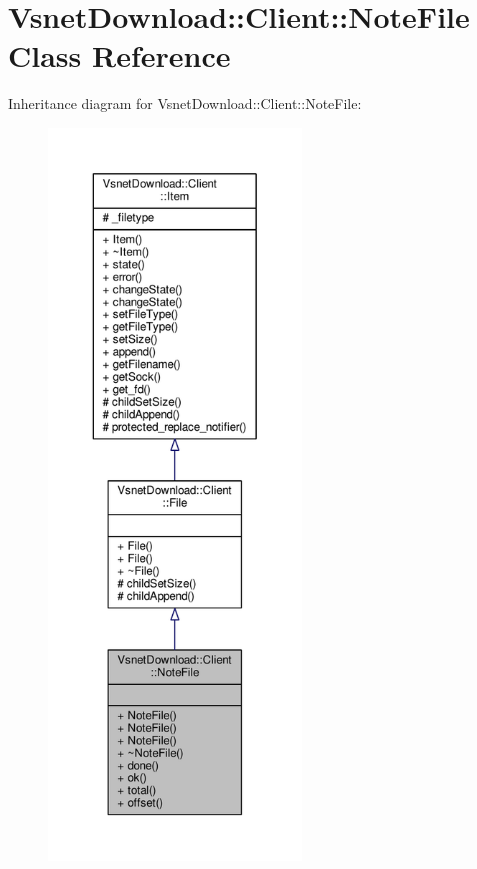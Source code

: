 \hypertarget{classVsnetDownload_1_1Client_1_1NoteFile}{}\section{Vsnet\+Download\+:\+:Client\+:\+:Note\+File Class Reference}
\label{classVsnetDownload_1_1Client_1_1NoteFile}


Inheritance diagram for Vsnet\+Download\+:\+:Client\+:\+:Note\+File\+:
\nopagebreak
\begin{figure}[H]
\begin{center}
\leavevmode
\includegraphics[height=550pt]{d1/d79/classVsnetDownload_1_1Client_1_1NoteFile__inherit__graph}
\end{center}
\end{figure}


